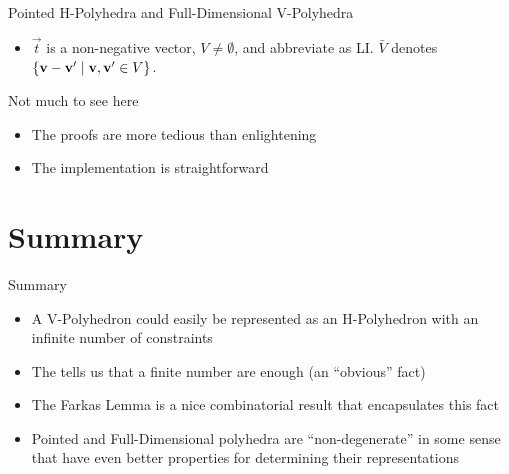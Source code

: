 \documentclass{beamer}
\begin{document}
\begin{frame}{Pointed H-Polyhedra and Full-Dimensional V-Polyhedra}
\begin{itemize}
  \item $\vec{t}$ is a non-negative vector, $V \neq \emptyset$, and abbreviate {\LI} as LI. $\bar V$ denotes $\{\mathbf{v}-\mathbf{v}'\;|\;\mathbf{v},\mathbf{v}'\in V\}$.\\

  \renewcommand{\arraystretch}{1.3}
\end{itemize}
\end{frame}

\begin{frame}{Not much to see here}
\begin{itemize}
  \item The proofs are more tedious than enlightening
  \item The implementation is straightforward
\end{itemize}
\end{frame}


\section*{Summary}

\begin{frame}{Summary}
	\begin{itemize}
		\item<1-> A V-Polyhedron could easily be represented as an H-Polyhedron with an infinite number of constraints
		\item<2-> The {\MWT} tells us that a finite number are enough (an ``obvious'' fact)
		\item<3-> The Farkas Lemma is a nice combinatorial result that encapsulates this fact
    \item<4-> Pointed and Full-Dimensional polyhedra are ``non-degenerate'' in some sense that have even better properties for determining their representations
	\end{itemize}
\end{frame}
\end{document}
